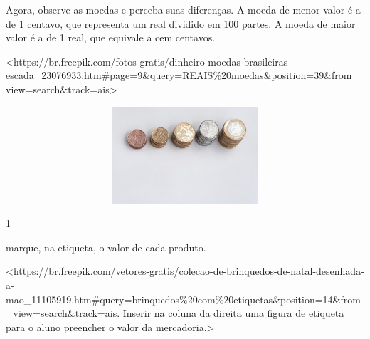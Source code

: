 
Agora, observe as moedas e perceba suas diferenças. A moeda de menor valor é a de 1 centavo, que representa um real dividido em 100 partes. A moeda de maior valor é a de 1 real, que equivale a cem centavos.

\textless{}https://br.freepik.com/fotos-gratis/dinheiro-moedas-brasileiras-escada\_23076933.htm\#page=9\&query=REAIS\%20moedas\&position=39\&from\_view=search\&track=ais\textgreater{}

\includegraphics[width=5.90556in,height=1.41667in]{media/image54.jpg}\protect\hypertarget{_heading=h.eii4svey01jf}{}{}


\num{1}

marque, na etiqueta, o valor de cada produto.

\textless{}https://br.freepik.com/vetores-gratis/colecao-de-brinquedos-de-natal-desenhada-a-mao\_11105919.htm\#query=brinquedos\%20com\%20etiquetas\&position=14\&from\_view=search\&track=ais.
Inserir na coluna da direita uma figura de etiqueta para o aluno
preencher o valor da mercadoria.\textgreater{}

